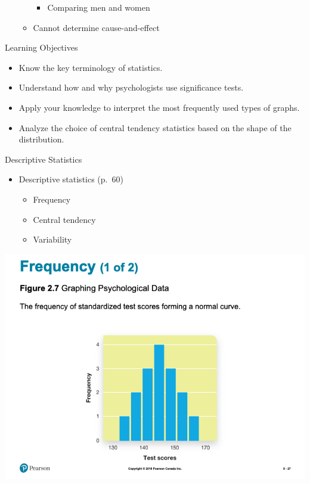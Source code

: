 \documentclass[
]{book}
\providecommand{\tightlist}{%
  \setlength{\itemsep}{0pt}\setlength{\parskip}{0pt}}
\begin{document}
\begin{reflect}
\begin{itemize}
\begin{itemize}
    \begin{itemize}
    \tightlist
    \item
      Comparing men and women\\
    \end{itemize}
  \item
    Cannot determine cause-and-effect
  \end{itemize}
\end{itemize}

Learning Objectives

\begin{itemize}
\tightlist
\item
  Know the key terminology of statistics.\\
\item
  Understand how and why psychologists use significance tests.\\
\item
  Apply your knowledge to interpret the most frequently used types of graphs.\\
\item
  Analyze the choice of central tendency statistics based on the shape of the distribution.
\end{itemize}

Descriptive Statistics

\begin{itemize}
\tightlist
\item
  Descriptive statistics (p.~60)

  \begin{itemize}
  \tightlist
  \item
    Frequency\\
  \item
    Central tendency\\
  \item
    Variability
  \end{itemize}
\end{itemize}

\includegraphics{assets/unit_1/slide_27.png}


\end{reflect}
\end{document}
